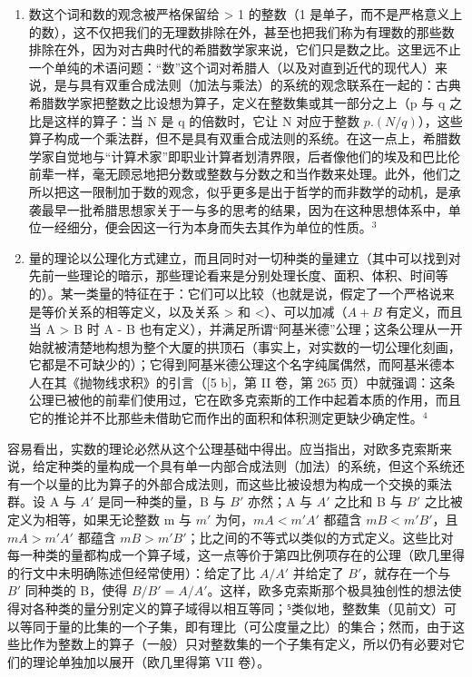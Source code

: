 \begin{enumerate}
\def\labelenumi{\arabic{enumi})}
\item
  数这个词和数的观念被严格保留给 \textgreater{} 1 的整数（1 是单子，而不是严格意义上的数），这不仅把我们的无理数排除在外，甚至也把我们称为有理数的那些数排除在外，因为对古典时代的希腊数学家来说，它们只是数之比。这里远不止一个单纯的术语问题：“数”这个词对希腊人（以及对直到近代的现代人）来说，是与具有双重合成法则（加法与乘法）的系统的观念联系在一起的：古典希腊数学家把整数之比设想为算子，定义在整数集或其一部分之上（p 与 q 之比是这样的算子：当 N 是 q 的倍数时，它让 N 对应于整数 \(p.(N/q)\)），这些算子构成一个乘法群，但不是具有双重合成法则的系统。在这一点上，希腊数学家自觉地与“计算术家”即职业计算者划清界限，后者像他们的埃及和巴比伦前辈一样，毫无顾忌地把分数或整数与分数之和当作数来处理。此外，他们之所以把这一限制加于数的观念，似乎更多是出于哲学的而非数学的动机，是承袭最早一批希腊思想家关于一与多的思考的结果，因为在这种思想体系中，单位一经细分，便会因这一行为本身而失去其作为单位的性质。\(^{3}\)
\item
  量的理论以公理化方式建立，而且同时对一切种类的量建立（其中可以找到对先前一些理论的暗示，那些理论看来是分别处理长度、面积、体积、时间等的）。某一类量的特征在于：它们可以比较（也就是说，假定了一个严格说来是等价关系的相等定义，以及关系 \textgreater{} 和 \textless{}）、可以加减（\(A + B\) 有定义，而且当 A \textgreater{} B 时 A - B 也有定义），并满足所谓“阿基米德”公理；这条公理从一开始就被清楚地构想为整个大厦的拱顶石（事实上，对实数的一切公理化刻画，它都是不可缺少的）；它得到阿基米德公理这个名字纯属偶然，而阿基米德本人在其《抛物线求积》的引言（{[}5 b{]}，第 II 卷，第 265 页）中就强调：这条公理已被他的前辈们使用过，它在欧多克索斯的工作中起着本质的作用，而且它的推论并不比那些未借助它而作出的面积和体积测定更缺少确定性。\(^{4}\)
\end{enumerate}

容易看出，实数的理论必然从这个公理基础中得出。应当指出，对欧多克索斯来说，给定种类的量构成一个具有单一内部合成法则（加法）的系统，但这个系统还有一个以量的比为算子的外部合成法则，而这些比被设想为构成一个交换的乘法群。设 A 与 \(A'\) 是同一种类的量，B 与 \(B'\) 亦然；A 与 \(A'\) 之比和 B 与 \(B'\) 之比被定义为相等，如果无论整数 m 与 \(m'\) 为何，\(mA < m'A'\) 都蕴含 \(mB < m'B'\)，且 \(mA > m'A'\) 都蕴含 \(mB > m'B'\)；比之间的不等式以类似的方式定义。这些比对每一种类的量都构成一个算子域，这一点等价于第四比例项存在的公理（欧几里得的行文中未明确陈述但经常使用）：给定了比 \(A/A'\) 并给定了 \(B'\)，就存在一个与 \(B'\) 同种类的 B，使得 \(B/B' = A/A'\)。这样，欧多克索斯那个极具独创性的想法使得对各种类的量分别定义的算子域得以相互等同；⁵类似地，整数集（见前文）可以等同于量的比集的一个子集，即有理比（可公度量之比）的集合；然而，由于这些比作为整数上的算子（一般）只对整数集的一个子集有定义，所以仍有必要对它们的理论单独加以展开（欧几里得第 VII 卷）。

